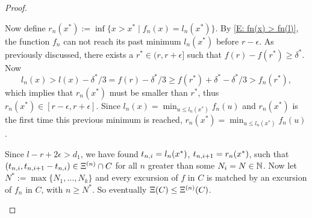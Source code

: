 \begin{proof}
\begin{proofpart}
Now define 
$r_n(x^*) := \inf \{ x > x^* \; | \; f_n(x) = l_n(x^*) \}$.
By \eqref{E: fn(x) > fn(l)}, the function $f_n$ can not reach its past minimum $l_n(x^*)$
before $r-\epsilon$.
As previously discussed,
there exists a $r^* \in (r, r+\epsilon]$ such that $f(r) - f(r^*) \geq \delta^*$.
Now
\begin{equation}
l_n(x) > l(x) - \delta^* / 3 = f(r) - \delta^* / 3 \geq f(r^*) + \delta^* - \delta^* / 3 > f_n(r^*),
\end{equation}
which implies that $r_n(x^*)$ must be smaller than $r^*$,
thus $r_n(x^*) \in [r - \epsilon, r+ \epsilon]$.
Since $l_n(x) = \min_{u \leq l_n(x^*)} f_n(u)$
and $r_n(x^*)$ is the first time this previous minimum is reached,
$r_n(x^*) = \min_{u \leq l_n(x^*)} f_n(u)$.


Since $l - r + 2\epsilon > d_1$,
we have found $t_{n, i} = l_n(x^*)$, $t_{n, i+1} = r_n(x^*)$,
such that $(t_{n, i}, t_{n, i+1} - t_{n, i}) \in \Xi^{(n)} \cap C$
for all $n$ greater than some $N_i = N \in \mathbb{N}$.
Now let $N^* := \max\{N_1, \dots, N_k\}$ 
and every excursion of $f$ in $C$ is matched by an excursion of $f_n$ in $C$,
with $n \geq N^*$.
So eventually $\Xi (C) \leq \Xi^{(n)}(C)$.
\end{proofpart}


\begin{proofpart} \label{PP: Lemma 7 2}


\end{proofpart}
\end{proof}
